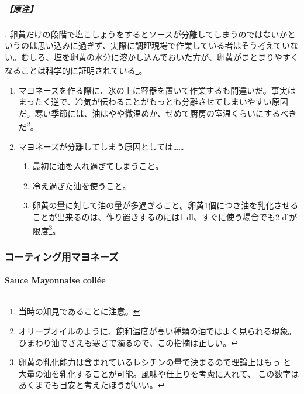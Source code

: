 \begin{recette}
\hypertarget{ux539fux6ce8-2}{%
\subparagraph{【原注】}\label{ux539fux6ce8-2}}

.
卵黄だけの段階で塩こしょうをするとソースが分離してしまうのではないかというのは思い込みに過ぎず、実際に調理現場で作業している者はそう考えていない。むしろ、塩を卵黄の水分に溶かし込んでおいた方が、卵黄がまとまりやすくなることは科学的に証明されている\footnote{当時の知見であることに注意。}。

\begin{enumerate}
\def\labelenumi{\arabic{enumi}.}
\setcounter{enumi}{1}
\item
  マヨネーズを作る際に、氷の上に容器を置いて作業するも間違いだ。事実はまったく逆で、冷気が伝わることがもっとも分離させてしまいやすい原因だ。寒い季節には、油はやや微温めか、せめて厨房の室温くらいにするべきだ\footnote{オリーブオイルのように、飽和温度が高い種類の油ではよく見られる現象。ひまわり油でさえも寒さで濁るので、この指摘は正しい。}。
\item
  マヨネーズが分離してしまう原因としては\ldots{}\ldots{}

  \begin{enumerate}
  \def\labelenumii{\arabic{enumii}.}
  \item
    最初に油を入れ過ぎてしまうこと。
  \item
    冷え過ぎた油を使うこと。
  \item
    卵黄の量に対して油の量が多過ぎること。卵黄1個につき油を乳化させることが出来るのは、作り置きするのには1\troisquarts{}
    dl、すぐに使う場合でも2 dlが限度\footnote{卵黄の乳化能力は含まれているレシチンの量で決まるので理論上はもっ
      と大量の油を乳化することが可能。風味や仕上りを考慮に入れて、
      この数字はあくまでも目安と考えたほうがいい。}。
  \end{enumerate}
\end{enumerate}

\maeaki

\hypertarget{ux30b3ux30fcux30c6ux30a3ux30f3ux30b0ux7528ux30deux30e8ux30cdux30fcux30ba}{%
\subsubsection{コーティング用マヨネーズ}\label{ux30b3ux30fcux30c6ux30a3ux30f3ux30b0ux7528ux30deux30e8ux30cdux30fcux30ba}}

\hypertarget{mayonnaise-collee}{%
\paragraph{Sauce Mayonnaise collée}\label{mayonnaise-collee}}


\end{recette}
